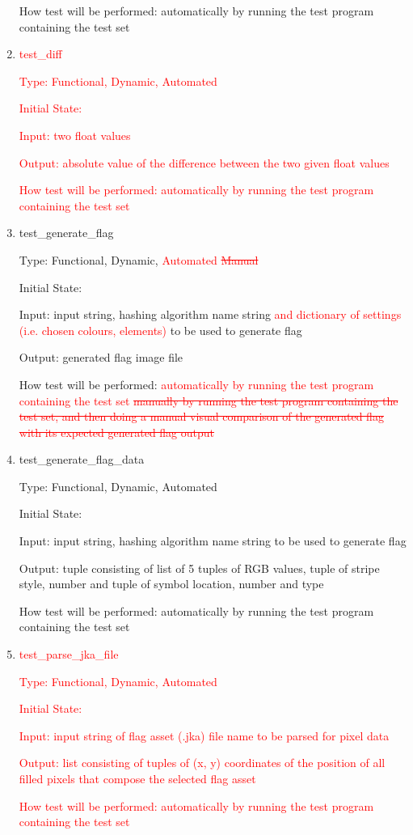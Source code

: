 \documentclass[12pt, titlepage]{article}
\begin{document}
\begin{enumerate}
How test will be performed: automatically by running the test program
containing the test set

\item{\textcolor{red}{test\_diff\\}}

\textcolor{red}{Type: Functional, Dynamic, Automated}

\textcolor{red}{Initial State:}

\textcolor{red}{Input: two float values}

\textcolor{red}{Output: absolute value of the difference between the two given
float values}

\textcolor{red}{How test will be performed: automatically by running the test
program containing the test set}

\item{test\_generate\_flag\\}

Type: Functional, Dynamic, \textcolor{red}{Automated \sout{Manual}}

Initial State:

Input: input string, hashing algorithm name string \textcolor{red}{and
dictionary of settings (i.e. chosen colours, elements)} to be used to generate
flag

Output: generated flag image file

How test will be performed: \textcolor{red}{automatically by running the test
program containing the test set \sout{manually by running the test program
containing the test set, and then doing a manual visual comparison of the
generated flag with its expected generated flag output}}

\item{test\_generate\_flag\_data\\}

Type: Functional, Dynamic, Automated

Initial State:

Input: input string, hashing algorithm name string to be used to generate flag

Output: tuple consisting of list of 5 tuples of RGB values, tuple of stripe
style, number and tuple of symbol location, number and type

How test will be performed: automatically by running the test program
containing the test set

\item{\textcolor{red}{test\_parse\_jka\_file\\}}

\textcolor{red}{Type: Functional, Dynamic, Automated}

\textcolor{red}{Initial State:}

\textcolor{red}{Input: input string of flag asset (.jka) file name to be
parsed for pixel data}

\textcolor{red}{Output: list consisting of tuples of (x, y) coordinates of the
position of all filled pixels that compose the selected flag asset}

\textcolor{red}{How test will be performed: automatically by running the test
program containing the test set}

\end{enumerate}
\end{document}
